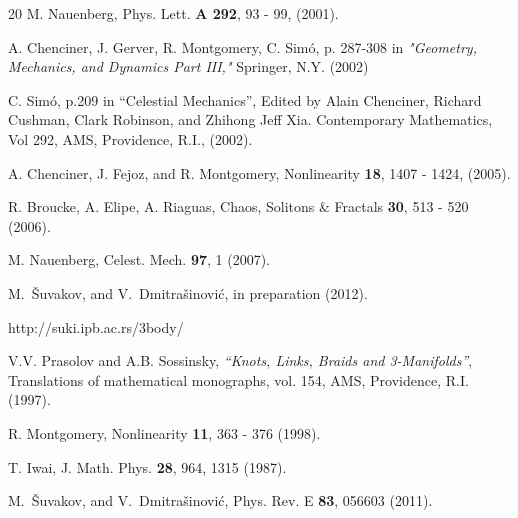 \documentclass[twocolumn,showpacs,showkeys,preprintnumbers,amsmath,amssymb]{revtex4}
\begin{document}
\begin{thebibliography}{20}
M. Nauenberg,
Phys. Lett. {\bf A 292}, 93 - 99, (2001).

A. Chenciner, J. Gerver, R. Montgomery, C. Sim{\' o},
p. 287-308 in {\it "Geometry, Mechanics, and Dynamics 
Part III,"}  Springer, N.Y. (2002)

C. Sim{\' o}, 
p.209  in ``Celestial Mechanics'',
Edited by Alain Chenciner, Richard Cushman, Clark Robinson, and Zhihong Jeff Xia. 
Contemporary Mathematics, Vol 292, AMS, Providence, R.I., (2002).

A. Chenciner, J. Fejoz, and R. Montgomery,
Nonlinearity {\bf 18}, 1407 - 1424, (2005).

R. Broucke, A. Elipe, A. Riaguas, 
Chaos, Solitons \& Fractals {\bf 30}, 513 - 520 (2006).

M. Nauenberg,
Celest. Mech. {\bf 97}, 1 (2007).

M.~\v Suvakov, and V.~Dmitra\v sinovi\' c, 
in preparation (2012).

http://suki.ipb.ac.rs/3body/

V.V. Prasolov and A.B. Sossinsky, {\it ``Knots, Links, Braids and
3-Manifolds''}, Translations of mathematical monographs, vol. 154,
AMS, Providence, R.I. (1997).

R. Montgomery, 
Nonlinearity {\bf 11}, 363 - 376 (1998).

T. Iwai, 
J. Math. Phys. {\bf 28}, 964, 1315 (1987). 

M.~\v Suvakov, and V.~Dmitra\v sinovi\' c,
Phys. Rev. E {\bf 83}, 056603 (2011).


\end{thebibliography}
\end{document}
